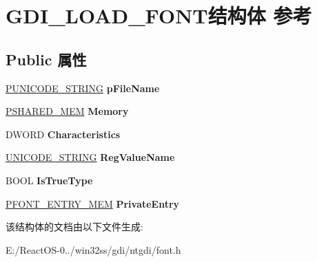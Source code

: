 \hypertarget{struct_g_d_i___l_o_a_d___f_o_n_t}{}\section{G\+D\+I\+\_\+\+L\+O\+A\+D\+\_\+\+F\+O\+N\+T结构体 参考}
\label{struct_g_d_i___l_o_a_d___f_o_n_t}
\subsection*{Public 属性}
\begin{DoxyCompactItemize}
\item 
\mbox{\label{struct_g_d_i___l_o_a_d___f_o_n_t_a29cc8a00d882c41043e67052b07a454b}} 
\hyperlink{struct___u_n_i_c_o_d_e___s_t_r_i_n_g}{P\+U\+N\+I\+C\+O\+D\+E\+\_\+\+S\+T\+R\+I\+NG} {\bfseries p\+File\+Name}
\item 
\mbox{\label{struct_g_d_i___l_o_a_d___f_o_n_t_a638ebb46b10516080ff66e3f9e11d9d7}} 
\hyperlink{struct___s_h_a_r_e_d___m_e_m}{P\+S\+H\+A\+R\+E\+D\+\_\+\+M\+EM} {\bfseries Memory}
\item 
\mbox{\label{struct_g_d_i___l_o_a_d___f_o_n_t_ae0c0b73a4a33e2bb464bff43d60301e3}} 
D\+W\+O\+RD {\bfseries Characteristics}
\item 
\mbox{\label{struct_g_d_i___l_o_a_d___f_o_n_t_a80740629ed51b35d453838dcbf13df3c}} 
\hyperlink{struct___u_n_i_c_o_d_e___s_t_r_i_n_g}{U\+N\+I\+C\+O\+D\+E\+\_\+\+S\+T\+R\+I\+NG} {\bfseries Reg\+Value\+Name}
\item 
\mbox{\label{struct_g_d_i___l_o_a_d___f_o_n_t_a8c186ee8894a1720b847339b16b78696}} 
B\+O\+OL {\bfseries Is\+True\+Type}
\item 
\mbox{\label{struct_g_d_i___l_o_a_d___f_o_n_t_a5a60fae8d3e510b6deb299e6b87e5e7b}} 
\hyperlink{struct___f_o_n_t___e_n_t_r_y___m_e_m}{P\+F\+O\+N\+T\+\_\+\+E\+N\+T\+R\+Y\+\_\+\+M\+EM} {\bfseries Private\+Entry}
\end{DoxyCompactItemize}


该结构体的文档由以下文件生成\+:\begin{DoxyCompactItemize}
\item 
E\+:/\+React\+O\+S-\/0../win32ss/gdi/ntgdi/font.\+h\end{DoxyCompactItemize}
